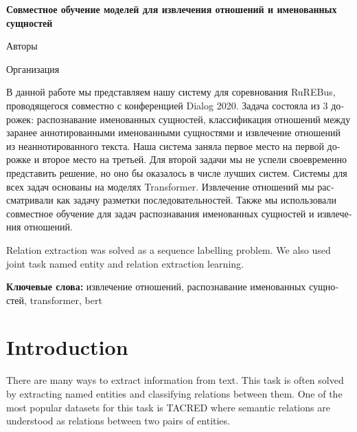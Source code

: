 \documentclass{dialogue}
\begin{document}
	\begin{otherlanguage}{russian}
		\begin{center}
			{\Large\bfseries{Совместное обучение моделей для извлечения отношений и именованных сущностей}}
			
			\medskip
			
			Авторы
			
			\medskip
			
			Организация
		\end{center}
		
		В данной работе мы представляем нашу систему для соревнования RuREBus, проводящегося совместно с конференцией Dialog 2020. Задача состояла из 3 дорожек: распознавание именованных сущностей, классификация отношений между заранее аннотированными именованными сущностями и извлечение отношений из неаннотированного текста. Наша система заняла первое место на первой дорожке и второе место на третьей. Для второй задачи мы не успели своевременно представить решение, но оно бы оказалось в числе лучших систем. Системы для всех задач основаны на моделях Transformer. Извлечение отношений мы рассматривали как задачу разметки последовательностей. Также мы использовали совместное обучение для задач распознавания именованных сущностей и извлечения отношений.
		
		Relation extraction was solved as a sequence labelling problem. We also used joint task named entity and relation extraction learning.
		\medskip
		
		\textbf{Ключевые слова:} извлечение отношений, распознавание именованных сущностей, transformer, bert
	\end{otherlanguage}
	
	
	\section{Introduction}
	There are many ways to extract information from text. This task is often solved by extracting named entities and classifying relations between them. One of the most popular datasets for this task is TACRED \cite{tacred} where semantic relations are understood as relations between two pairs of entities.
	
\end{document}
